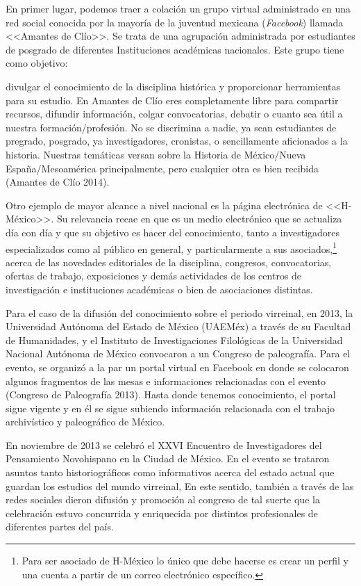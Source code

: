 En primer lugar, podemos traer a colación un grupo virtual administrado en una
red social conocida por la mayoría de la juventud mexicana ({\itshape Facebook}) llamada
<<Amantes de Clío>>. Se trata de una agrupación administrada por estudiantes de
posgrado de diferentes Instituciones académicas nacionales. Este grupo tiene
como objetivo:


\begin{sloppypar}
divulgar el conocimiento de
la disciplina histórica y proporcionar herramientas para su estudio. En Amantes
de Clío eres completamente libre para compartir recursos, difundir información,
colgar convocatorias, debatir o cuanto sea útil a nuestra formación\slash{}profesión.
No se discrimina a nadie, ya sean estudiantes de pregrado, posgrado, ya
investigadores, cronistas, o sencillamente aficionados a la historia. Nuestras
temáticas versan sobre la Historia de México\slash{}Nueva España\slash{}Mesoamérica
principalmente, pero cualquier otra es bien recibida (Amantes de Clío 2014).
\end{sloppypar}

Otro ejemplo de mayor alcance
a nivel nacional es la página electrónica de <<H-México>>. Su relevancia recae en
que es un medio electrónico que se actualiza día con día y que su objetivo es
hacer del conocimiento, tanto a investigadores especializados como al público
en general, y particularmente a sus asociados,\footnote{Para ser asociado de
H-México lo único que debe hacerse es crear un perfil y una cuenta a partir de
un correo electrónico
específico.}  acerca de las
novedades editoriales de la disciplina, congresos, convocatorias, ofertas de
trabajo, exposiciones y demás actividades de los centros de investigación e
instituciones académicas o bien de asociaciones distintas.


Para el caso de la difusión
del conocimiento sobre el periodo virreinal, en 2013, la Universidad Autónoma
del Estado de México (UAEMéx) a través de su Facultad de
 Humanidades, y el Instituto
de Investigaciones Filológicas de la Universidad Nacional Autónoma de México
convocaron a un Congreso de paleografía. Para el evento, se organizó a la par
un portal virtual en Facebook en donde se colocaron algunos fragmentos de las
mesas e informaciones relacionadas con el evento (Congreso de Paleografía
2013). Hasta donde tenemos conocimiento, el portal sigue vigente y en él se
sigue subiendo información relacionada con el trabajo archivístico y
paleográfico de México.


En noviembre de 2013 se
celebró el XXVI Encuentro de Investigadores del Pensamiento Novohispano en la
Ciudad de México. En el evento se trataron asuntos tanto historiográficos como
informativos acerca del estado actual que guardan los estudios del mundo
virreinal, En este sentido, también a través de las redes sociales dieron
difusión y promoción al congreso de tal suerte que la celebración estuvo
concurrida y enriquecida por distintos profesionales de diferentes partes del
país.

